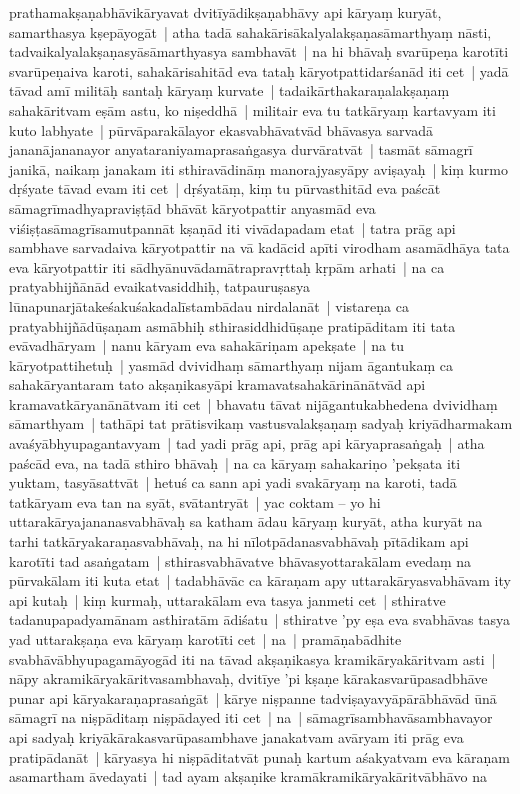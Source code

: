 \documentclass[article,12pt,a4paper]{memoir}
\begin{document}
prathamakṣaṇabhāvikāryavat dvitīyādikṣaṇabhāvy api kāryaṃ kuryāt, samarthasya kṣepāyogāt | \label{thakur75-90.2} atha tadā sahakārisākalyalakṣaṇasāmarthyaṃ nāsti, tadvaikalyalakṣaṇasyāsāmarthyasya sambhavāt | na hi bhāvaḥ svarūpeṇa karotīti svarūpeṇaiva karoti, sahakārisahitād eva tataḥ kāryotpattidarśanād iti cet | \label{thakur75-90.4} yadā tāvad amī militāḥ santaḥ kāryaṃ kurvate | tadaikārthakaraṇalakṣaṇaṃ sahakāritvam eṣām astu, ko niṣeddhā | militair eva tu tatkāryaṃ kartavyam iti kuto labhyate | pūrvāparakālayor ekasvabhāvatvād bhāvasya sarvadā jananājananayor anyataraniyamaprasaṅgasya durvāratvāt | tasmāt sāmagrī janikā, naikaṃ janakam iti sthiravādināṃ manorajyasyāpy aviṣayaḥ | \label{thakur75-90.9} kiṃ kurmo dṛśyate tāvad evam iti cet | dṛśyatāṃ, kiṃ tu pūrvasthitād eva paścāt sāmagrīmadhyapraviṣṭād bhāvāt kāryotpattir anyasmād eva viśiṣṭasāmagrīsamutpannāt kṣaṇād iti vivādapadam etat | tatra prāg api sambhave sarvadaiva kāryotpattir na vā kadācid apīti virodham asamādhāya tata eva kāryotpattir iti sādhyānuvādamātrapravṛttaḥ kṛpām arhati | \label{thakur75-90.14} na ca pratyabhijñānād evaikatvasiddhiḥ, tatpauruṣasya lūnapunarjātakeśakuśakadalīstambādau nirdalanāt | vistareṇa ca pratyabhijñādūṣaṇam asmābhiḥ sthirasiddhidūṣaṇe pratipāditam iti tata evāvadhāryam | \label{thakur75-90.17} nanu kāryam eva sahakāriṇam apekṣate | na tu kāryotpattihetuḥ | yasmād dvividhaṃ sāmarthyaṃ nijam āgantukaṃ ca sahakāryantaram tato akṣaṇikasyāpi kramavatsahakārinānātvād api kramavatkāryanānātvam iti cet | \label{thakur75-90.19} bhavatu tāvat nijāgantukabhedena dvividhaṃ sāmarthyam | tathāpi tat prātisvikaṃ vastusvalakṣaṇaṃ sadyaḥ kriyādharmakam avaśyābhyupagantavyam | tad yadi prāg api, prāg api kāryaprasaṅgaḥ | atha paścād eva, na tadā sthiro bhāvaḥ | \label{thakur75-90.23} na ca kāryaṃ sahakariṇo 'pekṣata iti yuktam, tasyāsattvāt | hetuś ca sann api yadi svakāryaṃ na karoti, tadā tatkāryam eva tan na syāt, svātantryāt | \label{thakur75-90.25} yac coktam – yo hi uttarakāryajananasvabhāvaḥ sa katham ādau kāryaṃ kuryāt, atha kuryāt na tarhi tatkāryakaraṇasvabhāvaḥ, na hi nīlotpādanasvabhāvaḥ pītādikam api karotīti tad asaṅgatam | sthirasvabhāvatve bhāvasyottarakālam evedaṃ na pūrvakālam iti kuta etat | tadabhāvāc ca kāraṇam apy uttarakāryasvabhāvam ity api kutaḥ | \label{thakur75-90.29} kiṃ kurmaḥ, uttarakālam eva tasya janmeti cet | sthiratve tadanupapadyamānam asthiratām ādiśatu | sthiratve 'py eṣa eva svabhāvas tasya yad uttarakṣaṇa eva kāryaṃ karotīti cet | na | pramāṇabādhite svabhāvābhyupagamāyogād iti na tāvad akṣaṇikasya kramikāryakāritvam asti | nāpy akramikāryakāritvasambhavaḥ, dvitīye 'pi kṣaṇe kārakasvarūpasadbhāve punar api kāryakaraṇaprasaṅgāt | \label{thakur75-91.4} kārye niṣpanne tadviṣayavyāpārābhāvād ūnā sāmagrī na niṣpāditaṃ niṣpādayed iti cet | na | sāmagrīsambhavāsambhavayor api sadyaḥ kriyākārakasvarūpasambhave janakatvam avāryam iti prāg eva pratipādanāt | kāryasya hi niṣpāditatvāt punaḥ kartum aśakyatvam eva kāraṇam asamartham āvedayati | \label{thakur75-91.7} tad ayam akṣaṇike kramākramikāryakāritvābhāvo na 
\end{document}
